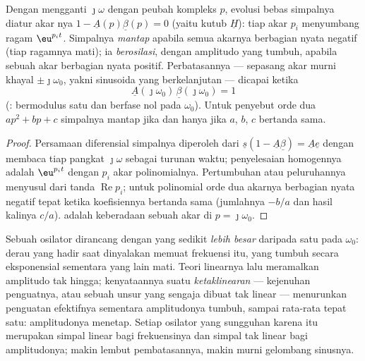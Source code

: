\begin{theorem}\label{thm:b2:feedback-oscillators:stability}
Dengan mengganti $\jmath\omega$ dengan peubah kompleks $p$, evolusi bebas
simpalnya diatur akar \emph{}nya
$1 - \underline A(p)\underline\beta(p) = 0$ (yaitu kutub $\underline H$): tiap akar
$p_i$ menyumbang ragam $\eu^{p_it}$. Simpalnya \emph{mantap} apabila semua
akarnya berbagian nyata negatif (tiap ragamnya mati); ia
\emph{berosilasi}, dengan amplitudo yang tumbuh, apabila sebuah akar berbagian
nyata positif. Perbatasannya --- sepasang akar murni khayal $\pm\jmath
\omega_0$, yakni sinusoida yang berkelanjutan --- dicapai ketika
\[
\underline A(\jmath\omega_0)\,\underline\beta(\jmath\omega_0) = 1
\]
(\emph{}:  bermodulus satu dan berfase
nol pada $\omega_0$). Untuk penyebut orde dua $ap^2 + bp + c$
simpalnya mantap jika dan hanya jika $a$, $b$, $c$ bertanda sama.
\end{theorem}

\begin{proof}
Persamaan diferensial simpalnya diperoleh dari $\underline s(1 -
\underline A\underline\beta) = \underline A\underline e$ dengan membaca tiap pangkat $\jmath\omega$
sebagai turunan waktu; penyelesaian homogennya adalah $\eu^{p_it}$
dengan $p_i$ akar polinomialnya. Pertumbuhan atau peluruhannya menyusul dari
tanda $\operatorname{Re}p_i$; untuk polinomial orde dua akarnya
berbagian nyata negatif tepat ketika koefisiennya bertanda sama
(jumlahnya $-b/a$ dan hasil kalinya $c/a$). 
adalah keberadaan sebuah akar di $p = \jmath\omega_0$.
\end{proof}

\begin{remark}\label{rem:b2:feedback-oscillators:start}
Sebuah osilator dirancang dengan  yang sedikit \emph{lebih besar} daripada
satu pada $\omega_0$: derau yang hadir saat dinyalakan memuat frekuensi itu,
yang tumbuh secara eksponensial sementara yang lain mati. Teori linearnya lalu
meramalkan amplitudo tak hingga; kenyataannya suatu \emph{ketaklinearan} ---
kejenuhan penguatnya, atau sebuah unsur yang sengaja dibuat tak linear ---
menurunkan penguatan efektifnya sementara amplitudonya tumbuh, sampai
 rata-rata tepat satu: amplitudonya menetap. Setiap osilator
yang sungguhan karena itu merupakan simpal linear bagi frekuensinya dan simpal tak linear
bagi amplitudonya; makin lembut pembatasannya, makin murni
gelombang sinusnya.
\end{remark}

